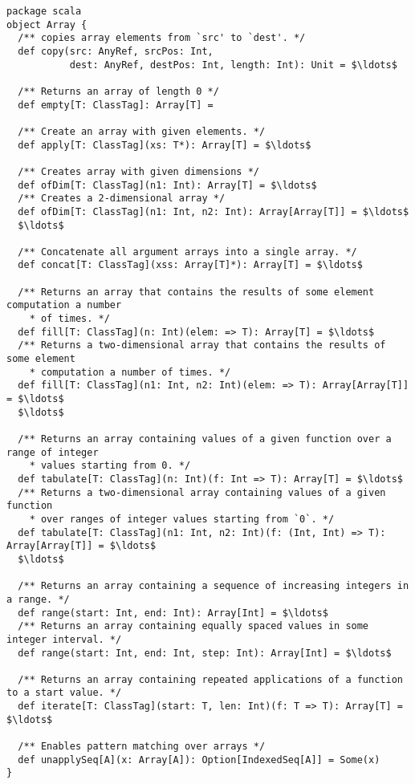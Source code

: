 \begin{lstlisting}
package scala
object Array { 
  /** copies array elements from `src' to `dest'. */
  def copy(src: AnyRef, srcPos: Int,
           dest: AnyRef, destPos: Int, length: Int): Unit = $\ldots$

  /** Returns an array of length 0 */
  def empty[T: ClassTag]: Array[T] =

  /** Create an array with given elements. */
  def apply[T: ClassTag](xs: T*): Array[T] = $\ldots$

  /** Creates array with given dimensions */
  def ofDim[T: ClassTag](n1: Int): Array[T] = $\ldots$
  /** Creates a 2-dimensional array */
  def ofDim[T: ClassTag](n1: Int, n2: Int): Array[Array[T]] = $\ldots$
  $\ldots$

  /** Concatenate all argument arrays into a single array. */
  def concat[T: ClassTag](xss: Array[T]*): Array[T] = $\ldots$

  /** Returns an array that contains the results of some element computation a number
    * of times. */
  def fill[T: ClassTag](n: Int)(elem: => T): Array[T] = $\ldots$
  /** Returns a two-dimensional array that contains the results of some element
    * computation a number of times. */
  def fill[T: ClassTag](n1: Int, n2: Int)(elem: => T): Array[Array[T]] = $\ldots$
  $\ldots$

  /** Returns an array containing values of a given function over a range of integer
    * values starting from 0. */
  def tabulate[T: ClassTag](n: Int)(f: Int => T): Array[T] = $\ldots$
  /** Returns a two-dimensional array containing values of a given function
    * over ranges of integer values starting from `0`. */
  def tabulate[T: ClassTag](n1: Int, n2: Int)(f: (Int, Int) => T): Array[Array[T]] = $\ldots$
  $\ldots$

  /** Returns an array containing a sequence of increasing integers in a range. */
  def range(start: Int, end: Int): Array[Int] = $\ldots$
  /** Returns an array containing equally spaced values in some integer interval. */
  def range(start: Int, end: Int, step: Int): Array[Int] = $\ldots$

  /** Returns an array containing repeated applications of a function to a start value. */
  def iterate[T: ClassTag](start: T, len: Int)(f: T => T): Array[T] = $\ldots$

  /** Enables pattern matching over arrays */
  def unapplySeq[A](x: Array[A]): Option[IndexedSeq[A]] = Some(x)
}
\end{lstlisting}

